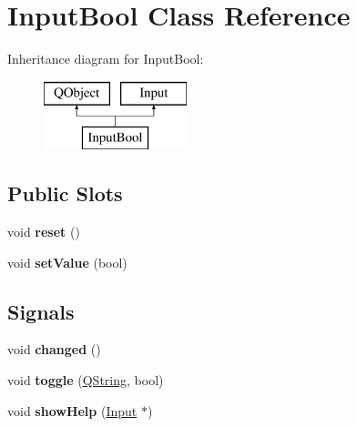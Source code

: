 \hypertarget{class_input_bool}{}\section{Input\+Bool Class Reference}
\label{class_input_bool}
Inheritance diagram for Input\+Bool\+:\begin{figure}[H]
\begin{center}
\leavevmode
\includegraphics[height=2.000000cm]{class_input_bool}
\end{center}
\end{figure}
\subsection*{Public Slots}
\begin{DoxyCompactItemize}
\item 
\mbox{\label{class_input_bool_a6fcd5209f610ec46710bb4133d908f94}} 
void {\bfseries reset} ()
\item 
\mbox{\label{class_input_bool_a45b8963e33372106280a9b79ad273acb}} 
void {\bfseries set\+Value} (bool)
\end{DoxyCompactItemize}
\subsection*{Signals}
\begin{DoxyCompactItemize}
\item 
\mbox{\label{class_input_bool_a321a7b75c6aea35d25f8a09bd636694a}} 
void {\bfseries changed} ()
\item 
\mbox{\label{class_input_bool_adf11e1243ca0ad963b19264b0d8556ff}} 
void {\bfseries toggle} (\mbox{\hyperlink{class_q_string}{Q\+String}}, bool)
\item 
\mbox{\label{class_input_bool_a5a106ff283efd58007d8b0958a0f8c54}} 
void {\bfseries show\+Help} (\mbox{\hyperlink{class_input}{Input}} $\ast$)
\end{DoxyCompactItemize}
